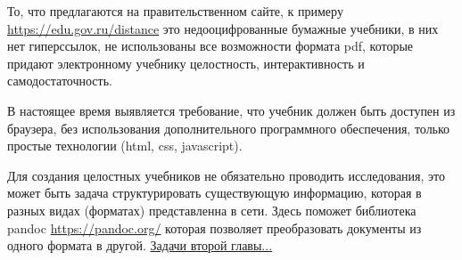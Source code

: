 То, что предлагаются на правительственном сайте, к примеру \url{https://edu.gov.ru/distance} это недооцифрованные бумажные учебники, в них нет гиперссылок, не использованы все возможности формата pdf, которые придают электронному учебнику целостность, интерактивность и самодостаточность.


В настоящее время выявляется требование, что учебник должен быть доступен из браузера, без использования дополнительного программного обеспечения, только простые технологии (html, css, javascript). 

Для создания целостных учебников не обязательно проводить исследования, это может быть задача структурировать существующую информацию, которая в разных видах (форматах) представленна в сети. Здесь поможет библиотека pandoc \url{https://pandoc.org/} которая позволяет преобразовать документы из одного формата в другой.
\hyperref[task2]{Задачи второй главы...}